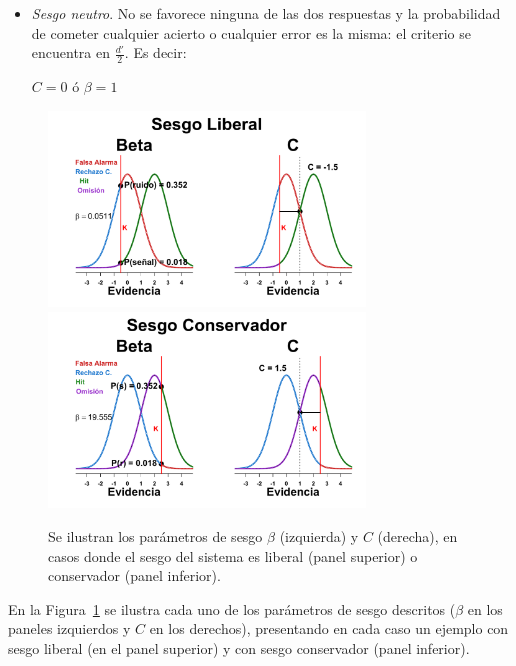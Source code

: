 \begin{itemize}
\begin{itemize}
\item \textsl{Sesgo neutro}. No se favorece ninguna de las dos respuestas y la probabilidad de cometer cualquier acierto o cualquier error es la misma: el criterio se encuentra en $\frac{d'}{2}$. Es decir: \\
\begin{center}
$C = 0$ \qquad ó \qquad $\beta = 1$\\
\end{center}
\end{itemize}

\begin{figure}[h]
\centering
\includegraphics[width=0.75\textwidth]{Figures/Graficador_Sesgo_LiberalR}\\
\includegraphics[width=0.75\textwidth]{Figures/Graficador_Sesgo_ConservadorR}\\
\decoRule
\caption[Estimación paramétrica: Sesgos $\beta$ y $c$]{Se ilustran los parámetros de sesgo $\beta$ (izquierda) y $C$ (derecha), en casos donde el sesgo del sistema es liberal (panel superior) o conservador (panel inferior).}
\label{fig:Graf_Sesgo}
\end{figure}

En la Figura~\ref{fig:Graf_Sesgo} se ilustra cada uno de los parámetros de sesgo descritos ($\beta$ en los paneles izquierdos y $C$ en los derechos), presentando en cada caso un ejemplo con sesgo liberal (en el panel superior) y con sesgo conservador (panel inferior). \\
\end{itemize}

